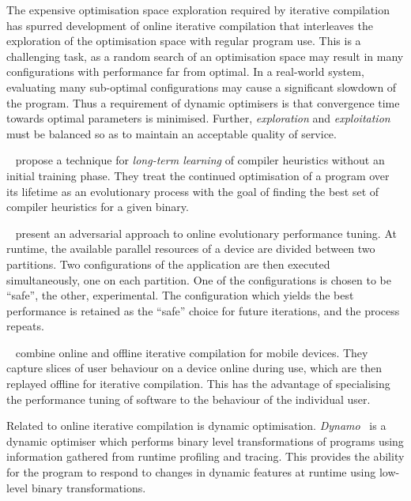 The expensive optimisation space exploration required by iterative compilation has spurred development of online iterative compilation that interleaves the exploration of the optimisation space with regular program use. This is a challenging task, as a random search of an optimisation space may result in many configurations with performance far from optimal. In a real-world system, evaluating many sub-optimal configurations may cause a significant slowdown of the program. Thus a requirement of dynamic optimisers is that convergence time towards optimal parameters is minimised. Further, \emph{exploration} and \emph{exploitation} must be balanced so as to maintain an acceptable quality of service.

\citeauthor{Tartara2013}~\cite{Tartara2013} propose a technique for \emph{long-term learning} of compiler heuristics without an initial training phase. They treat the continued optimisation of a program over its lifetime as an evolutionary process with the goal of finding the best set of compiler heuristics for a given binary.

\citeauthor{Ansel2012}~\cite{Ansel2012} present an adversarial approach to online evolutionary performance tuning. At runtime, the available parallel resources of a device are divided between two partitions. Two configurations of the application are then executed simultaneously, one on each partition. One of the configurations is chosen to be ``safe'', the other, experimental. The configuration which yields the best performance is retained as the ``safe'' choice for future iterations, and the process repeats.

\citeauthor{Mpeis2015}~\cite{Mpeis2015} combine online and offline iterative compilation for mobile devices. They capture slices of user behaviour on a device online during use, which are then replayed offline for iterative compilation. This has the advantage of specialising the performance tuning of software to the behaviour of the individual user.

Related to online iterative compilation is dynamic optimisation. \emph{Dynamo}~\cite{Bala2000} is a dynamic optimiser which performs binary level transformations of programs using information gathered from runtime profiling and tracing. This provides the ability for the program to respond to changes in dynamic features at runtime using low-level binary transformations.



